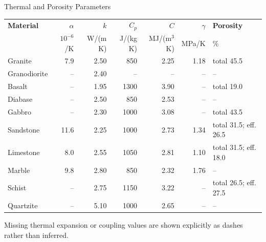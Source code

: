 \documentclass[aspectratio=169,10pt]{beamer}
\begin{document}
\begin{frame}{Thermal and Porosity Parameters}
  \scriptsize
  \renewcommand{\arraystretch}{1.12}
  \setlength{\tabcolsep}{3.2pt}
  \begin{tabular}{l|r|r|r|r|r|>{\raggedright\arraybackslash}p{}}
    \hline
    \textbf{Material} & $\alpha$ & $k$ & $C_p$ & $C$ & $\gamma$ & \textbf{Porosity} \\
    & $10^{-6}$/K & W/(m K) & J/(kg K) & MJ/(m$^3$ K) & MPa/K & \% \\
    \hline
    Granite & 7.9 & 2.50 & 850 & 2.25 & 1.18 & total 45.5 \\
    Granodiorite & -- & 2.40 & -- & -- & -- & -- \\
    Basalt & -- & 1.95 & 1300 & 3.90 & -- & total 19.0 \\
    Diabase & -- & 2.50 & 850 & 2.53 & -- & -- \\
    Gabbro & -- & 2.30 & 1000 & 3.08 & -- & total 43.5 \\
    Sandstone & 11.6 & 2.25 & 1000 & 2.73 & 1.34 & total 31.5; eff. 26.5 \\
    Limestone & 8.0 & 2.55 & 1050 & 2.81 & 1.10 & total 31.5; eff. 18.0 \\
    Marble & 9.8 & 2.80 & 850 & 2.32 & 1.76 & -- \\
    Schist & -- & 2.75 & 1150 & 3.22 & -- & total 26.5; eff. 27.5 \\
    Quartzite & -- & 5.10 & 1000 & 2.65 & -- & -- \\
    \hline
  \end{tabular}
  \vskip 6pt
  Missing thermal expansion or coupling values are shown explicitly as dashes
  rather than inferred.
\end{frame}
\end{document}
